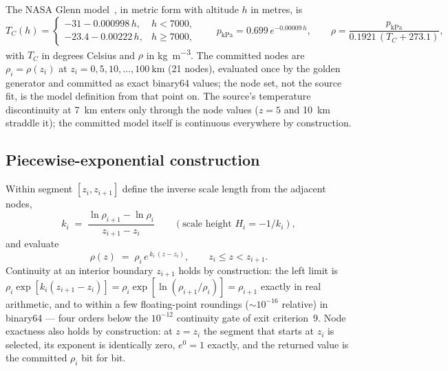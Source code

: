 The NASA Glenn model~\cite{nasaglennmars}, in metric form with altitude
$h$ in metres, is
\begin{equation}
  T_C(h) =
  \begin{cases}
    -31 - 0.000998\,h, & h < 7000, \\
    -23.4 - 0.00222\,h, & h \ge 7000,
  \end{cases}
  \qquad
  p_{\mathrm{kPa}} = 0.699\,e^{-0.00009\,h},
  \qquad
  \rho = \frac{p_{\mathrm{kPa}}}{0.1921\,(T_C + 273.1)},
  \label{eq:mars:glenn}
\end{equation}
with $T_C$ in degrees Celsius and $\rho$ in
\unit{\kilogram\per\metre\cubed}. The committed nodes are
$\rho_i = \rho(z_i)$ at $z_i = 0, 5, 10, \dots, \qty{100}{\kilo\metre}$
(21 nodes), evaluated once by the golden generator and committed as exact
binary64 values; the node set, not the source fit, is the model
definition from that point on. The source's temperature discontinuity at
\qty{7}{\kilo\metre} enters only through the node values ($z = 5$ and
\qty{10}{\kilo\metre} straddle it); the committed model itself is
continuous everywhere by construction.

\subsection{Piecewise-exponential construction}

Within segment $[z_i, z_{i+1}]$ define the inverse scale length from the
adjacent nodes,
\begin{equation}
  k_i \;=\; \frac{\ln \rho_{i+1} - \ln \rho_i}{z_{i+1} - z_i}
  \qquad\left(\text{scale height } H_i = -1/k_i\right),
  \label{eq:mars:scaleheight}
\end{equation}
and evaluate
\begin{equation}
  \rho(z) \;=\; \rho_i\, e^{\,k_i\,(z - z_i)},
  \qquad z_i \le z < z_{i+1}.
  \label{eq:mars:segment}
\end{equation}
Continuity at an interior boundary $z_{i+1}$ holds by construction: the
left limit is $\rho_i \exp[k_i (z_{i+1} - z_i)] =
\rho_i \exp[\ln(\rho_{i+1}/\rho_i)] = \rho_{i+1}$ exactly in real
arithmetic, and to within a few floating-point roundings ($\sim 10^{-16}$
relative) in binary64 --- four orders below the $10^{-12}$ continuity
gate of exit criterion~9. Node exactness also holds by construction: at
$z = z_i$ the segment that starts at $z_i$ is selected, its exponent is
identically zero, $e^{0} = 1$ exactly, and the returned value is the
committed $\rho_i$ bit for bit.

